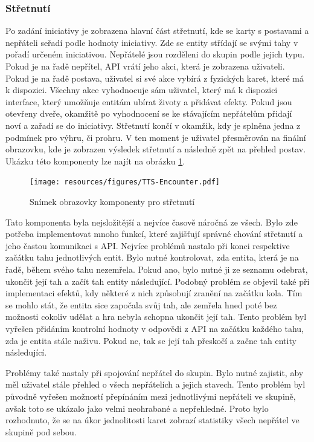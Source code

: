 \subsubsection*{Střetnutí}
Po zadání iniciativy je zobrazena hlavní část střetnutí, kde se karty s postavami a nepřáteli seřadí podle hodnoty iniciativy. Zde se entity střídají se svými tahy v pořadí určeném iniciativou. Nepřátelé jsou rozděleni do skupin podle jejich typu. Pokud je na řadě nepřítel, API vrátí jeho akci, která je zobrazena uživateli. Pokud je na řadě postava, uživatel si své akce vybírá z fyzických karet, které má k dispozici. Všechny akce vyhodnocuje sám uživatel, který má k dispozici interface, který umožňuje entitám ubírat životy a přidávat efekty. Pokud jsou otevřeny dveře, okamžitě po vyhodnocení se ke stávajícím nepřátelům přidají noví a zařadí se do iniciativy. Střetnutí končí v okamžik, kdy je splněna jedna z podmínek pro výhru, či prohru. V ten moment je uživatel přesměrován na finální obrazovku, kde je zobrazen výsledek střetnutí a následně zpět na přehled postav. Ukázku této komponenty lze najít na obrázku \ref{fig:combat}.

\begin{figure}[H]
  \centering
  \texttt{[image: resources/figures/TTS-Encounter.pdf]}
  \caption{Snímek obrazovky komponenty pro střetnutí}
  \label{fig:combat}
\end{figure}

Tato komponenta byla nejsložitější a nejvíce časově náročná ze všech. Bylo zde potřeba implementovat mnoho funkcí, které zajišťují správné chování střetnutí a jeho častou komunikaci s API. Nejvíce problémů nastalo při konci respektive začátku tahu jednotlivých entit. Bylo nutné kontrolovat, zda entita, která je na řadě, během svého tahu nezemřela. Pokud ano, bylo nutné ji ze seznamu odebrat, ukončit její tah a začít tah entity následující. Podobný problém se objevil také při implementaci efektů, kdy některé z nich způsobují zranění na začátku kola. Tím se mohlo stát, že entita sice započala svůj tah, ale zemřela hned poté bez možnosti cokoliv udělat a hra nebyla schopna ukončit její tah. Tento problém byl vyřešen přidáním kontrolní hodnoty v odpovědi z API na začátku každého tahu, zda je entita stále naživu. Pokud ne, tak se její tah přeskočí a začne tah entity následující.

Problémy také nastaly při spojování nepřátel do skupin. Bylo nutné zajistit, aby měl uživatel stále přehled o všech nepřátelích a jejich stavech. Tento problém byl původně vyřešen možností přepínáním mezi jednotlivými nepřáteli ve skupině, avšak toto se ukázalo jako velmi neohrabané a nepřehledné. Proto bylo rozhodnuto, že se na úkor jednolitosti karet zobrazí statistiky všech nepřátel ve skupině pod sebou.


